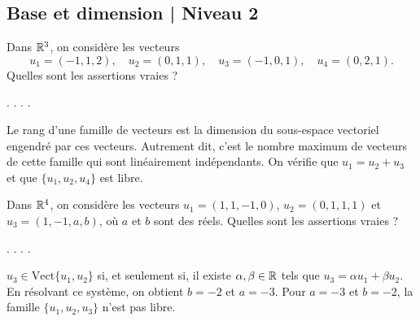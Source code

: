\subsection{Base et dimension | Niveau 2}

\begin{question}
Dans $\mathbb{R}^3$, on considère les vecteurs
$$u_1=(-1,1,2),\quad u_2=(0,1,1),\quad  u_3=(-1,0,1),\quad u_4=(0,2,1).$$
Quelles sont les assertions vraies ?
\begin{answers}  
.
.
.
.
\end{answers}
\begin{explanations} Le rang d'une famille de vecteurs est la dimension du sous-espace vectoriel
engendré par ces vecteurs. Autrement dit, c'est le nombre maximum de vecteurs de cette famille qui sont linéairement indépendants. On vérifie que $u_1=u_2+u_3 $ et que $\{u_1,u_2,u_4\}$ est libre.
\end{explanations}
\end{question}


\begin{question}
Dans $\mathbb{R}^4$, on considère les vecteurs $u_1=(1,1,-1,0)$, $u_2=(0,1,1,1)$ et $u_3=(1,-1,a,b)$, où $a$ et $b$ sont des réels. Quelles sont les assertions vraies ?
\begin{answers}  
.
.
.
.
\end{answers}
\begin{explanations} $u_3 \in {\mbox{Vect}} \{u_1,u_2\}$ si, et seulement si, il existe $\alpha, \beta \in \mathbb{R}$ tels que 
$u_3=\alpha u_1+ \beta u_2$. En résolvant ce système, on obtient $b=-2$ et $a=-3$. Pour $a=-3$ et $b=-2$, la famille $\{u_1,u_2,u_3\}$ n'est pas libre.
\end{explanations}
\end{question}

